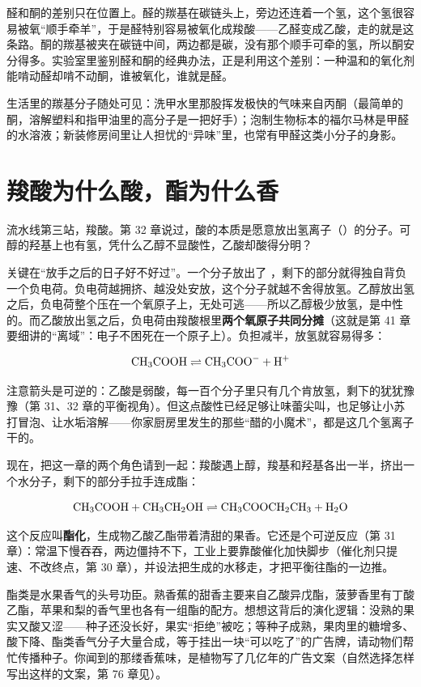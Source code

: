 醛和酮的差别只在位置上。醛的羰基在碳链头上，旁边还连着一个氢，这个氢很容易被氧“顺手牵羊”，于是醛特别容易被氧化成羧酸——乙醛变成乙酸，走的就是这条路。酮的羰基被夹在碳链中间，两边都是碳，没有那个顺手可牵的氢，所以酮安分得多。实验室里鉴别醛和酮的经典办法，正是利用这个差别：一种温和的氧化剂能啃动醛却啃不动酮，谁被氧化，谁就是醛。

生活里的羰基分子随处可见：洗甲水里那股挥发极快的气味来自丙酮（最简单的酮，溶解塑料和指甲油里的高分子是一把好手）；泡制生物标本的福尔马林是甲醛的水溶液；新装修房间里让人担忧的“异味”里，也常有甲醛这类小分子的身影。

\section{羧酸为什么酸，酯为什么香}

流水线第三站，羧酸。第 32 章说过，酸的本质是愿意放出氢离子（）的分子。可醇的羟基上也有氢，凭什么乙醇不显酸性，乙酸却酸得分明？

关键在“放手之后的日子好不好过”。一个分子放出了 ，剩下的部分就得独自背负一个负电荷。负电荷越拥挤、越没处安放，这个分子就越不舍得放氢。乙醇放出氢之后，负电荷整个压在一个氧原子上，无处可逃——所以乙醇极少放氢，是中性的。而乙酸放出氢之后，负电荷由羧酸根里\textbf{两个氧原子共同分摊}（这就是第 41 章要细讲的“离域”：电子不困死在一个原子上）。负担减半，放氢就容易得多：

\[\mathrm{CH_3COOH} \rightleftharpoons \mathrm{CH_3COO^-} + \mathrm{H^+}\]

注意箭头是可逆的：乙酸是弱酸，每一百个分子里只有几个肯放氢，剩下的犹犹豫豫（第 31、32 章的平衡视角）。但这点酸性已经足够让味蕾尖叫，也足够让小苏打冒泡、让水垢溶解——你家厨房里发生的那些“醋的小魔术”，都是这几个氢离子干的。

现在，把这一章的两个角色请到一起：羧酸遇上醇，羧基和羟基各出一半，挤出一个水分子，剩下的部分手拉手连成酯：

\[\mathrm{CH_3COOH} + \mathrm{CH_3CH_2OH} \rightleftharpoons \mathrm{CH_3COOCH_2CH_3} + \mathrm{H_2O}\]

这个反应叫\textbf{酯化}，生成物乙酸乙酯带着清甜的果香。它还是个可逆反应（第 31 章）：常温下慢吞吞，两边僵持不下，工业上要靠酸催化加快脚步（催化剂只提速、不改终点，第 30 章），并设法把生成的水移走，才把平衡往酯的一边推。

酯类是水果香气的头号功臣。熟香蕉的甜香主要来自乙酸异戊酯，菠萝香里有丁酸乙酯，苹果和梨的香气里也各有一组酯的配方。想想这背后的演化逻辑：没熟的果实又酸又涩——种子还没长好，果实“拒绝”被吃；等种子成熟，果肉里的糖增多、酸下降、酯类香气分子大量合成，等于挂出一块“可以吃了”的广告牌，请动物们帮忙传播种子。你闻到的那缕香蕉味，是植物写了几亿年的广告文案（自然选择怎样写出这样的文案，第 76 章见）。

